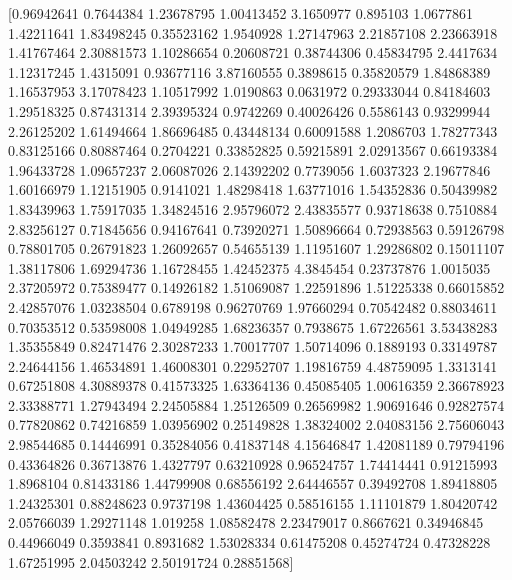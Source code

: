 \documentclass[preview]{standalone}
\begin{document}
\begin{center}
[0.96942641 0.7644384  1.23678795 1.00413452 3.1650977  0.895103
 1.0677861  1.42211641 1.83498245 0.35523162 1.9540928  1.27147963
 2.21857108 2.23663918 1.41767464 2.30881573 1.10286654 0.20608721
 0.38744306 0.45834795 2.4417634  1.12317245 1.4315091  0.93677116
 3.87160555 0.3898615  0.35820579 1.84868389 1.16537953 3.17078423
 1.10517992 1.0190863  0.0631972  0.29333044 0.84184603 1.29518325
 0.87431314 2.39395324 0.9742269  0.40026426 0.5586143  0.93299944
 2.26125202 1.61494664 1.86696485 0.43448134 0.60091588 1.2086703
 1.78277343 0.83125166 0.80887464 0.2704221  0.33852825 0.59215891
 2.02913567 0.66193384 1.96433728 1.09657237 2.06087026 2.14392202
 0.7739056  1.6037323  2.19677846 1.60166979 1.12151905 0.9141021
 1.48298418 1.63771016 1.54352836 0.50439982 1.83439963 1.75917035
 1.34824516 2.95796072 2.43835577 0.93718638 0.7510884  2.83256127
 0.71845656 0.94167641 0.73920271 1.50896664 0.72938563 0.59126798
 0.78801705 0.26791823 1.26092657 0.54655139 1.11951607 1.29286802
 0.15011107 1.38117806 1.69294736 1.16728455 1.42452375 4.3845454
 0.23737876 1.0015035  2.37205972 0.75389477 0.14926182 1.51069087
 1.22591896 1.51225338 0.66015852 2.42857076 1.03238504 0.6789198
 0.96270769 1.97660294 0.70542482 0.88034611 0.70353512 0.53598008
 1.04949285 1.68236357 0.7938675  1.67226561 3.53438283 1.35355849
 0.82471476 2.30287233 1.70017707 1.50714096 0.1889193  0.33149787
 2.24644156 1.46534891 1.46008301 0.22952707 1.19816759 4.48759095
 1.3313141  0.67251808 4.30889378 0.41573325 1.63364136 0.45085405
 1.00616359 2.36678923 2.33388771 1.27943494 2.24505884 1.25126509
 0.26569982 1.90691646 0.92827574 0.77820862 0.74216859 1.03956902
 0.25149828 1.38324002 2.04083156 2.75606043 2.98544685 0.14446991
 0.35284056 0.41837148 4.15646847 1.42081189 0.79794196 0.43364826
 0.36713876 1.4327797  0.63210928 0.96524757 1.74414441 0.91215993
 1.8968104  0.81433186 1.44799908 0.68556192 2.64446557 0.39492708
 1.89418805 1.24325301 0.88248623 0.9737198  1.43604425 0.58516155
 1.11101879 1.80420742 2.05766039 1.29271148 1.019258   1.08582478
 2.23479017 0.8667621  0.34946845 0.44966049 0.3593841  0.8931682
 1.53028334 0.61475208 0.45274724 0.47328228 1.67251995 2.04503242
 2.50191724 0.28851568]
\end{center}
\end{document}
